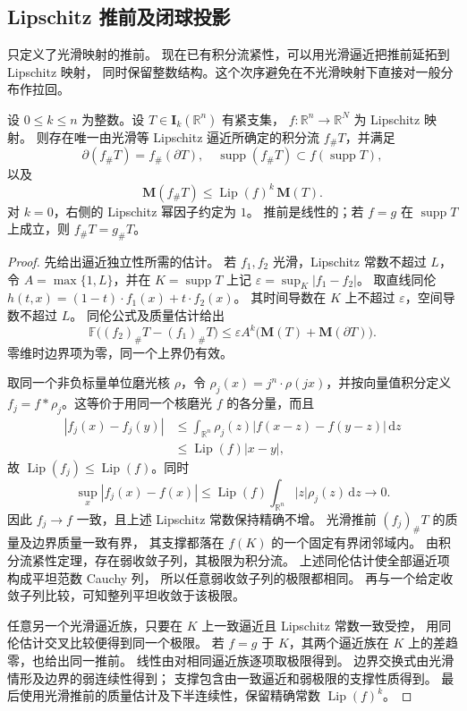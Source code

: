\subsection{Lipschitz 推前及闭球投影}
\label{b1:subsec:D10602}

只定义了光滑映射的推前。
现在已有积分流紧性，可以用光滑逼近把推前延拓到 Lipschitz 映射，
同时保留整数结构。这个次序避免在不光滑映射下直接对一般分布作拉回。

\begin{proposition}\label{b1:prop:app-d-lipschitz-pushforward}
设 \(0\le k\le n\) 为整数。设 \(T\in\mathbf I_k(\mathbb R^n)\) 有紧支集，
\(f:\mathbb R^n\rightarrow\mathbb R^N\) 为 Lipschitz 映射。
则存在唯一由光滑等 Lipschitz 逼近所确定的积分流 \(f_\#T\)，并满足
\[
 \partial(f_\#T)=f_\#(\partial T),\quad
 \operatorname{supp}(f_\#T)\subset f(\operatorname{supp}T),
\]
以及
\[
 \mathbf M(f_\#T)\leq\operatorname{Lip}(f)^k\,\mathbf M(T).
\]
对 \(k=0\)，右侧的 Lipschitz 幂因子约定为 \(1\)。
推前是线性的；若 \(f=g\) 在 \(\operatorname{supp}T\) 上成立，则 \(f_\#T=g_\#T\)。
\end{proposition}
\begin{proof}
先给出逼近独立性所需的估计。
若 \(f_1,f_2\) 光滑，Lipschitz 常数不超过 \(L\)，
令 \(A=\max\{1,L\}\)，并在
\(K=\operatorname{supp}T\) 上记
\(\varepsilon=\sup_K|f_1-f_2|\)。
取直线同伦 \(h(t,x)=(1-t)\cdot f_1(x)+t\cdot f_2(x)\)。
其时间导数在 \(K\) 上不超过 \(\varepsilon\)，空间导数不超过 \(L\)。
同伦公式及质量估计给出
\[
 \mathbb F\bigl((f_2)_\#T-(f_1)_\#T\bigr)
 \leq \varepsilon A^k\bigl(\mathbf M(T)+\mathbf M(\partial T)\bigr).
\]
零维时边界项为零，同一个上界仍有效。

取同一个非负标量单位磨光核 \(\rho\)，令
\(\rho_j(x)=j^n\cdot\rho(jx)\)，并按向量值积分定义
\(f_j=f*\rho_j\)。这等价于用同一个核磨光 \(f\) 的各分量，而且
\[
 \begin{split}
 |f_j(x)-f_j(y)|
 &\leq\int_{\mathbb R^n}\rho_j(z)
          |f(x-z)-f(y-z)|\,\mathrm{d}z\\
 &\leq\operatorname{Lip}(f)|x-y|,
 \end{split}
\]
故 \(\operatorname{Lip}(f_j)\leq\operatorname{Lip}(f)\)。同时
\[
 \sup_x|f_j(x)-f(x)|
 \leq\operatorname{Lip}(f)
       \int_{\mathbb R^n}|z|\rho_j(z)\,\mathrm{d}z
 \longrightarrow0.
\]
因此 \(f_j\rightarrow f\) 一致，且上述 Lipschitz 常数保持精确不增。
光滑推前 \((f_j)_\#T\) 的质量及边界质量一致有界，
其支撑都落在 \(f(K)\) 的一个固定有界闭邻域内。
由积分流紧性定理，存在弱收敛子列，其极限为积分流。
上述同伦估计使全部逼近项构成平坦范数 Cauchy 列，
所以任意弱收敛子列的极限都相同。
再与一个给定收敛子列比较，可知整列平坦收敛于该极限。

任意另一个光滑逼近族，只要在 \(K\) 上一致逼近且 Lipschitz 常数一致受控，
用同伦估计交叉比较便得到同一个极限。
若 \(f=g\) 于 \(K\)，其两个逼近族在 \(K\) 上的差趋零，也给出同一推前。
线性由对相同逼近族逐项取极限得到。
边界交换式由光滑情形及边界的弱连续性得到；
支撑包含由一致逼近和弱极限的支撑性质得到。
最后使用光滑推前的质量估计及下半连续性，保留精确常数
\(\operatorname{Lip}(f)^k\)。
\end{proof}


